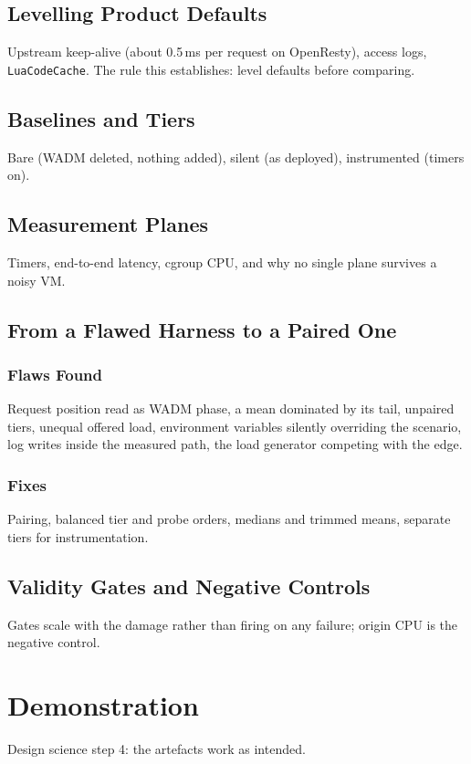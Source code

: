\documentclass{rptuma}
\begin{document}
\section{Levelling Product Defaults}
Upstream keep-alive (about 0.5\,ms per request on OpenResty), access logs, \texttt{LuaCodeCache}.
The rule this establishes: level defaults before comparing.

\section{Baselines and Tiers}
Bare (WADM deleted, nothing added), silent (as deployed), instrumented (timers on).

\section{Measurement Planes}
Timers, end-to-end latency, cgroup CPU, and why no single plane survives a noisy VM.

\section{From a Flawed Harness to a Paired One}
\subsection{Flaws Found}
Request position read as WADM phase, a mean dominated by its tail, unpaired tiers, unequal offered
load, environment variables silently overriding the scenario, log writes inside the measured path,
the load generator competing with the edge.
\subsection{Fixes}
Pairing, balanced tier and probe orders, medians and trimmed means, separate tiers for
instrumentation.

\section{Validity Gates and Negative Controls}
Gates scale with the damage rather than firing on any failure; origin CPU is the negative control.

\chapter{Demonstration}
Design science step 4: the artefacts work as intended.
\end{document}
